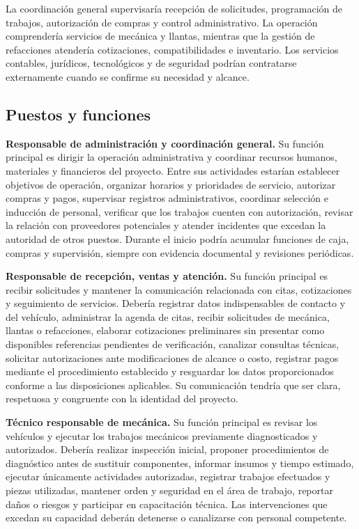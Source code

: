 {La coordinación general supervisaría recepción de solicitudes, programación de trabajos, autorización de compras y control administrativo. La operación comprendería servicios de mecánica y llantas, mientras que la gestión de refacciones atendería cotizaciones, compatibilidades e inventario. Los servicios contables, jurídicos, tecnológicos y de seguridad podrían contratarse externamente cuando se confirme su necesidad y alcance.

\subsection{Puestos y funciones}

\textbf{Responsable de administración y coordinación general.} Su función principal es dirigir la operación administrativa y coordinar recursos humanos, materiales y financieros del proyecto. Entre sus actividades estarían establecer objetivos de operación, organizar horarios y prioridades de servicio, autorizar compras y pagos, supervisar registros administrativos, coordinar selección e inducción de personal, verificar que los trabajos cuenten con autorización, revisar la relación con proveedores potenciales y atender incidentes que excedan la autoridad de otros puestos. Durante el inicio podría acumular funciones de caja, compras y supervisión, siempre con evidencia documental y revisiones periódicas.

\textbf{Responsable de recepción, ventas y atención.} Su función principal es recibir solicitudes y mantener la comunicación relacionada con citas, cotizaciones y seguimiento de servicios. Debería registrar datos indispensables de contacto y del vehículo, administrar la agenda de citas, recibir solicitudes de mecánica, llantas o refacciones, elaborar cotizaciones preliminares sin presentar como disponibles referencias pendientes de verificación, canalizar consultas técnicas, solicitar autorizaciones ante modificaciones de alcance o costo, registrar pagos mediante el procedimiento establecido y resguardar los datos proporcionados conforme a las disposiciones aplicables. Su comunicación tendría que ser clara, respetuosa y congruente con la identidad del proyecto.

\textbf{Técnico responsable de mecánica.} Su función principal es revisar los vehículos y ejecutar los trabajos mecánicos previamente diagnosticados y autorizados. Debería realizar inspección inicial, proponer procedimientos de diagnóstico antes de sustituir componentes, informar insumos y tiempo estimado, ejecutar únicamente actividades autorizadas, registrar trabajos efectuados y piezas utilizadas, mantener orden y seguridad en el área de trabajo, reportar daños o riesgos y participar en capacitación técnica. Las intervenciones que excedan su capacidad deberán detenerse o canalizarse con personal competente.

}
